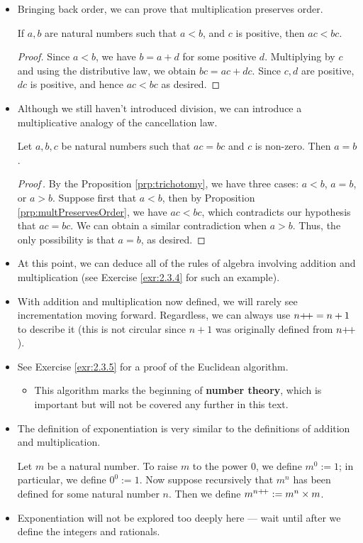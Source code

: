 \documentclass[../main.tex]{subfiles}
\begin{document}
\begin{itemize}
    \item Bringing back order, we can prove that multiplication preserves order.
    \begin{prop}\label{prp:multPreservesOrder}
        If $a,b$ are natural numbers such that $a<b$, and $c$ is positive, then $ac<bc$.
        \begin{proof}
            Since $a<b$, we have $b=a+d$ for some positive $d$. Multiplying by $c$ and using the distributive law, we obtain $bc=ac+dc$. Since $c,d$ are positive, $dc$ is positive, and hence $ac<bc$ as desired.
        \end{proof}
    \end{prop}
    \item Although we still haven't introduced division, we can introduce a multiplicative analogy of the cancellation law.
    \begin{cly}
        Let $a,b,c$ be natural numbers such that $ac=bc$ and $c$ is non-zero. Then $a=b$.
        \begin{proof}[Proof\,\footnotemark]
            By the Proposition \ref{prp:trichotomy}, we have three cases: $a<b$, $a=b$, or $a>b$. Suppose first that $a<b$, then by Proposition \ref{prp:multPreservesOrder}, we have $ac<bc$, which contradicts our hypothesis that $ac=bc$. We can obtain a similar contradiction when $a>b$. Thus, the only possibility is that $a=b$, as desired.
        \end{proof}
    \end{cly}
    \item At this point, we can deduce all of the rules of algebra involving addition and multiplication (see Exercise \ref{exr:2.3.4} for such an example).
    \item With addition and multiplication now defined, we will rarely see incrementation moving forward. Regardless, we can always use $n{+\!+}=n+1$ to describe it (this is not circular since $n+1$ was originally defined from $n{+\!+}$).
    \item See Exercise \ref{exr:2.3.5} for a proof of the Euclidean algorithm.
    \begin{itemize}
        \item This algorithm marks the beginning of \textbf{number theory}, which is important but will not be covered any further in this text.
    \end{itemize}
    \item The definition of exponentiation is very similar to the definitions of addition and multiplication.
    \begin{defn}\label{dfn:exponentiation}
        Let $m$ be a natural number. To raise $m$ to the power 0, we define $m^0:=1$; in particular, we define $0^0:=1$. Now suppose recursively that $m^n$ has been defined for some natural number $n$. Then we define $m^{n{+\!+}}:=m^n\times m$.
    \end{defn}
    \item Exponentiation will not be explored too deeply here --- wait until after we define the integers and rationals.
\end{itemize}
\end{document}
